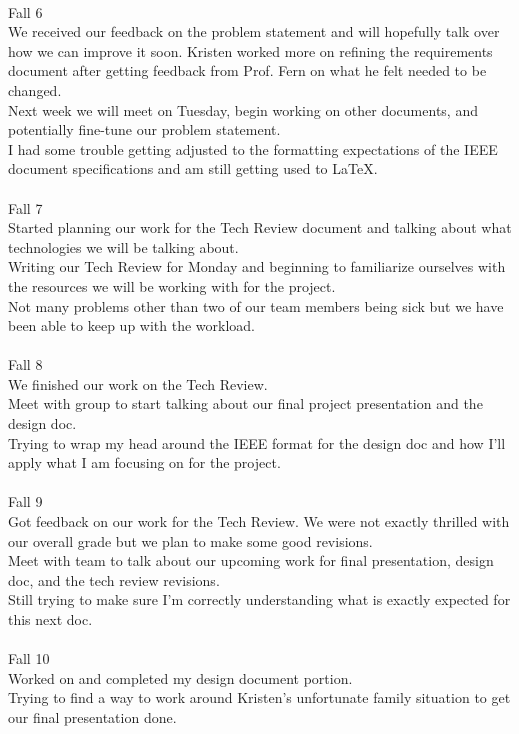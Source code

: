 \\
Fall 6\\
We received our feedback on the problem statement and will hopefully talk over how we can improve it soon. Kristen worked more on refining the requirements document after getting feedback from Prof. Fern on what he felt needed to be changed.\\ Next week we will meet on Tuesday, begin working on other documents, and potentially fine-tune our problem statement.\\ I had some trouble getting adjusted to the formatting expectations of the IEEE document specifications and am still getting used to LaTeX.\\
\\
Fall 7\\
Started planning our work for the Tech Review document and talking about what technologies we will be talking about.\\ Writing our Tech Review for Monday and beginning to familiarize ourselves with the resources we will be working with for the project.\\ Not many problems other than two of our team members being sick but we have been able to keep up with the workload.\\
\\
Fall 8\\
We finished our work on the Tech Review.\\ Meet with group to start talking about our final project presentation and the design doc.\\ Trying to wrap my head around the IEEE format for the design doc and how I'll apply what I am focusing on for the project.\\
\\
Fall 9\\
Got feedback on our work for the Tech Review. We were not exactly thrilled with our overall grade but we plan to make some good revisions.\\ Meet with team to talk about our upcoming work for final presentation, design doc, and the tech review revisions.\\ Still trying to make sure I'm correctly understanding what is exactly expected for this next doc.\\
\\
Fall 10\\
Worked on and completed my design document portion.\\ Trying to find a way to work around Kristen's unfortunate family situation to get our final presentation done.\\
